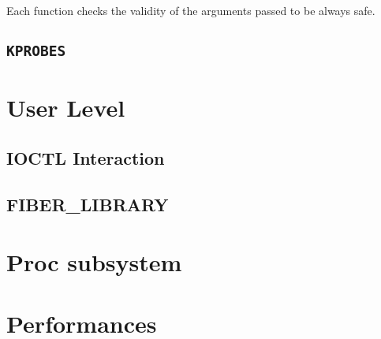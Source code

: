 \documentclass[a4paper]{article}
\begin{document}
Each function checks the validity of the arguments passed to be always safe.

\subsection*{\texttt{KPROBES}}


\section{User Level}
\subsection*{IOCTL Interaction}
\subsection*{FIBER\_LIBRARY}

\section{Proc subsystem}

\section{Performances}
\end{document}
